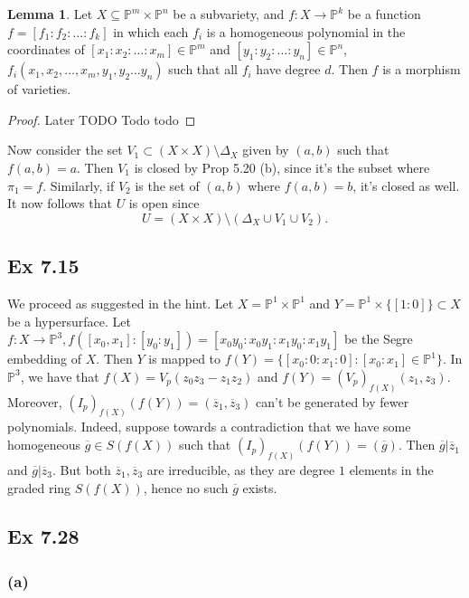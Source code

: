 \documentclass{article}
\theoremstyle{definition}
\newtheorem{lemma}[theorem]{Lemma}
\renewcommand{\P}{\mathbb{P}}
\newcommand{\PP}[1]{\P^{#1}}
\begin{document}
\begin{lemma}
	Let $X \subseteq \PP{m} \times \PP{n}$ be a subvariety, and $f : X \to
	\PP{k}$ be a function $f = [f_1 : f_2 : \ldots : f_k]$ in which each $f_i$
	is a homogeneous polynomial in the coordinates of $[x_1 : x_2 : \ldots :
	x_m] \in \PP{m}$ and $[y_1 : y_2 : \ldots : y_n] \in \PP{n}$, $f_i(x_1,
	x_2, \ldots, x_m, y_1, y_2 \ldots y_n)$ such that all $f_i$ have degree
	$d$. Then $f$ is a morphism of varieties.
\end{lemma}
\begin{proof}
	Later TODO Todo todo
\end{proof}

Now consider the set $V_1 \subset (X \times X) \setminus \Delta_X$ given by
$(a, b)$ such that $f(a, b) = a$. Then $V_1$ is closed by Prop 5.20 (b), since
it's the subset where $\pi_1 = f$. Similarly, if $V_2$ is the set of $(a, b)$
where $f(a, b) = b$, it's closed as well. It now follows that $U$ is open since
\[
	U = (X \times X) \setminus (\Delta_X \cup V_1 \cup V_2).
\]

\subsection*{Ex 7.15}

We proceed as suggested in the hint. Let $X = \PP{1} \times \PP{1}$ and $Y =
\PP{1} \times \{[1 : 0]\} \subset X$ be a hypersurface. Let $f : X \to \PP{3},
f([x_0, x_1] : [y_0 : y_1]) = [x_0y_0 : x_0y_1 : x_1y_0 : x_1y_1]$ be the Segre
embedding of $X$. Then $Y$ is mapped to $f(Y) = \{[x_0 : 0 : x_1 : 0] : [x_0 :
x_1] \in \PP{1} \}$. In $\PP{3}$, we have that $f(X) = V_p(z_0z_3 - z_1z_2)$
and $f(Y) = (V_p)_{f(X)}(z_1, z_3)$. Moreover, $(I_p)_{f(X)}(f(Y)) =
(\overline{z}_1, \overline{z}_3)$ can't be generated by fewer polynomials.
Indeed, suppose towards a contradiction that we have some homogeneous
$\overline{g} \in S(f(X))$ such that $(I_p)_{f(X)}(f(Y)) = (\overline{g})$.
Then $\overline{g} | \overline{z}_1$ and $\overline{g} | \overline{z}_3$. But
both $\overline{z}_1, \overline{z}_3$ are irreducible, as they are degree $1$
elements in the graded ring $S(f(X))$, hence no such $\overline{g}$ exists. 


\subsection*{Ex 7.28}

\subsubsection*{(a)}
\end{document}
